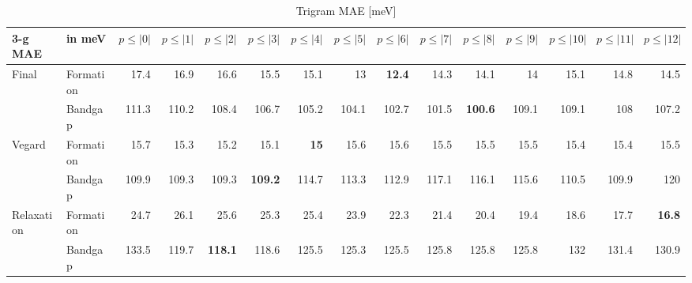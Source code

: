 \documentclass[11pt,oneside,czech,american]{book} %
\theoremstyle{definition} %
\theoremstyle{definition}
\begin{document}
\begin{table}[H]
	\scriptsize
	\centering
\begin{tabular}{llrrrrrrrrrrrrr}
	\hline
	3-g MAE    & in meV    &   $p{\leq}|0|$ &   $p{\leq}|1|$ &   $p{\leq}|2|$ &   $p{\leq}|3|$ &   $p{\leq}|4|$ &   $p{\leq}|5|$ &   $p{\leq}|6|$ &   $p{\leq}|7|$ &   $p{\leq}|8|$ &   $p{\leq}|9|$ &   $p{\leq}|10|$ &   $p{\leq}|11|$ &   $p{\leq}|12|$\\
	\hline
	\multirow{2}{*}{Final}      & Formation &       17.4 &       16.9 &       16.6 &       15.5 &       15.1 &       13   &       \textbf{12.4} &       14.3 &       14.1 &       14   &        15.1 &        14.8 &        14.5\\
	      & Bandgap   &      111.3 &      110.2 &      108.4 &      106.7 &      105.2 &      104.1 &      102.7 &      101.5 &      \textbf{100.6} &      109.1 &       109.1 &       108   &       107.2\\
	\multirow{2}{*}{Vegard}     & Formation &       15.7 &       15.3 &       15.2 &       15.1 &       \textbf{15}   &       15.6 &       15.6 &       15.5 &       15.5 &       15.5 &        15.4 &        15.4 &        15.5\\
	     & Bandgap   &      109.9 &      109.3 &      109.3 &      \textbf{109.2} &      114.7 &      113.3 &      112.9 &      117.1 &      116.1 &      115.6 &       110.5 &       109.9 &       120\\
	\multirow{2}{*}{Relaxation} & Formation &       24.7 &       26.1 &       25.6 &       25.3 &       25.4 &       23.9 &       22.3 &       21.4 &       20.4 &       19.4 &        18.6 &        17.7 &        \textbf{16.8}\\
	 & Bandgap   &      133.5 &      119.7 &      \textbf{118.1} &      118.6 &      125.5 &      125.3 &      125.5 &      125.8 &      125.8 &      125.8 &       132   &       131.4 &       130.9\\
	\hline
\end{tabular}	
	\caption{Trigram MAE [meV]}
	\label{3-g MAE}
\end{table}
\end{document}
